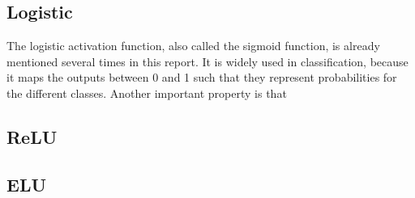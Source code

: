 \subsection{Logistic}
The logistic activation function, also called the sigmoid function, is already mentioned several times in this report. It is widely used in classification, because it maps the outputs between 0 and 1 such that they represent probabilities for the different classes. Another important property is that 

\subsection{ReLU}

\subsection{ELU}